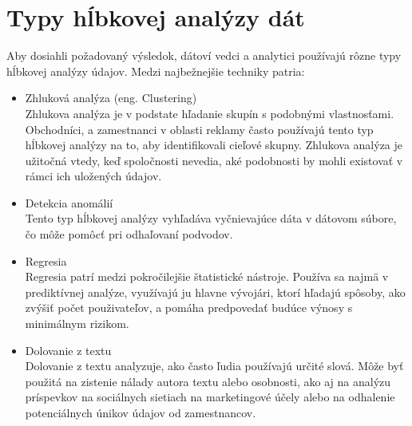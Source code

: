 \documentclass[10pt,twoside,slovak,a4paper]{article}
\begin{document}
\section{Typy hĺbkovej analýzy dát}
Aby dosiahli požadovaný výsledok, dátoví vedci a analytici používajú rôzne typy hĺbkovej analýzy údajov. Medzi najbežnejšie techniky patria:
\begin{itemize}
\item Zhluková analýza (eng. Clustering)\\
Zhlukova analýza je v podstate hľadanie skupín s podobnými vlastnosťami. Obchodníci, a zamestnanci v oblasti reklamy často používajú tento typ hĺbkovej analýzy na to, aby identifikovali cieľové skupny. Zhlukova analýza je užitočná vtedy, keď spoločnosti nevedia, aké podobnosti by mohli existovať v rámci ich uložených údajov.
\item Detekcia anomálií\\
Tento typ hĺbkovej analýzy vyhľadáva vyčnievajúce dáta v dátovom súbore, čo môže pomôcť pri odhaľovaní podvodov.
\item Regresia\\
Regresia patrí medzi pokročilejšie štatistické nástroje. Používa sa najmä v prediktívnej analýze, využívajú ju hlavne vývojári, ktorí hľadajú spôsoby, ako zvýšiť počet použivateľov, a pomáha predpovedať budúce výnosy s minimálnym rizikom.
\item Dolovanie z textu\\
Dolovanie z textu analyzuje, ako často ľudia používajú určité slová. Môže byť použitá na zistenie nálady autora textu alebo osobnosti, ako aj na analýzu príspevkov na sociálnych sietiach na marketingové účely alebo na odhalenie potenciálnych únikov údajov od zamestnancov.\cite{EmmaCroc}

\end{itemize}
\end{document}
